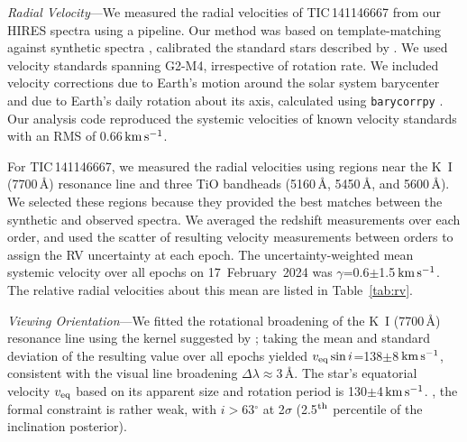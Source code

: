\documentclass[11pt,twocolumn,tighten]{aastex7}
\newcommand{\kms}{\ensuremath{\rm km\,s^{-1}}}
\begin{document}
{\it Radial Velocity}---We measured the radial velocities of
TIC\,141146667 from our HIRES
spectra using a pipeline.  Our method was based on
template-matching against synthetic spectra
\citep{Husser2013}, calibrated the
standard stars described by \citet{Chubak2012}.  We used velocity
standards spanning G2-M4, irrespective of rotation rate.  We included
velocity corrections due to Earth's motion around the solar system
barycenter and due to Earth's daily rotation about its axis,
calculated using \texttt{barycorrpy} \citep{Kanodia2018}.  Our
analysis code reproduced the systemic velocities of known velocity
standards \citep{Chubak2012} with an RMS of 0.66\,\kms.

For TIC\,141146667, we measured the radial velocities using regions
near the K~I (7700\,\AA) resonance line and three TiO bandheads
(5160\,\AA, 5450\,\AA, and 5600\,\AA).  We selected these regions
because they provided the best matches between the synthetic and
observed spectra.  We averaged the redshift measurements over each
order, and used the scatter of resulting velocity measurements between
orders to assign the RV uncertainty at each epoch.  The
uncertainty-weighted mean systemic velocity over all epochs on
17~February~2024 was $\gamma$=0.6$\pm$1.5\,\kms.  The relative radial
velocities about this mean are listed in Table~\ref{tab:rv}.

{\it Viewing Orientation}---We fitted the rotational broadening of the
K~I (7700\,\AA) resonance line using the kernel suggested by
\citet{Gray2008}; taking the mean and standard deviation of the
resulting value over all epochs yielded $v_{\rm eq} \sin
i$=138$\pm$8\,\kms, consistent with the visual line broadening $\Delta
\lambda$$\approx$3\,\AA.  The star's equatorial velocity $v_{\rm eq}$
based on its apparent size and rotation period is 130$\pm$4\,\kms.
, the formal constraint is rather weak, with $i$$>$63$^\circ$
at 2$\sigma$ (2.5$^{\rm th}$ percentile of the inclination posterior).

\end{document}
